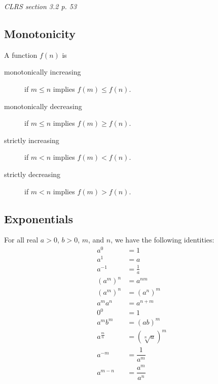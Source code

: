 \textit{CLRS section 3.2 p. 53}
\subsection{Monotonicity}
A function $ f(n) $ is
\begin{description}
    \item[monotonically increasing] if $ m \leq n $ implies $ f(m) \leq f(n) $.
    \item[monotonically decreasing] if $ m \leq n $ implies $ f(m) \geq f(n) $.
    \item[strictly increasing] if $ m < n $ implies $ f(m) < f(n) $.
    \item[strictly decreasing] if $ m < n $ implies $ f(m) > f(n) $.
\end{description}

\subsection{Exponentials}
For all real $ a > 0$, $ b > 0 $, $ m $, and $ n $, we have the following identities:\\
\begin{align*}
a^0 &= 1\\
a^1 &= a\\
a^{-1} &= \frac{1}{a}\\
\left( a^m\right) ^n &= a^{nm}\\
\left( a^m\right) ^n &= \left( a^n\right) ^m\\
a^ma^n &= a^{n+m}\\
0^0&=1\\
a^mb^m&=(ab)^m\\
a^\frac{m}{n} &= \left( \sqrt[n]{a}\right) ^m\\
a^{-m}&=\dfrac{1}{a^m}\\
a^{m-n}&=\dfrac{a^m}{a^n}
\end{align*}
